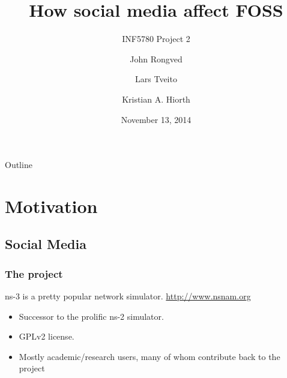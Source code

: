 \documentclass{beamer}
\title{How social media affect FOSS}
\subtitle{INF5780 Project 2}
\author{{John Rongved} \and {Lars Tveito} \and {Kristian A. Hiorth}}
\date{November 13, 2014}
\institute{Department of Informatics\\University of Oslo}
\newcommand{\coloreddot}[1][black]{\Large\textcolor{#1}{\ensuremath\bullet}}
\begin{document}
\begin{frame}
  \titlepage
\end{frame}

\begin{frame}{Outline}
  \tableofcontents{}
\end{frame}

\section{Motivation}

\subsection{Social Media}

\begin{frame}
  \frametitle{The project}
  ns-3 is a pretty popular network simulator. {\small
    \url{http://www.nsnam.org}}

  \begin{itemize}
  \item Successor to the prolific ns-2 simulator.
  \item GPLv2 license.
  \item Mostly academic/research users, many of whom contribute back to
    the project
  \end{itemize}
\end{frame}

\end{document}
